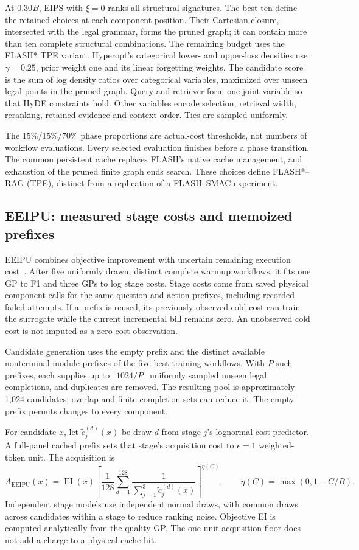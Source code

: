 At $0.30B$, EIPS with $\xi=0$ ranks all structural signatures. The best ten
define the retained choices at each component position. Their Cartesian
closure, intersected with the legal grammar, forms the pruned graph; it
can contain more than ten complete structural combinations. The remaining
budget uses the FLASH* TPE variant. Hyperopt's categorical lower- and
upper-loss densities use $\gamma=0.25$, prior weight one and its linear
forgetting weights. The candidate score is the sum of log density ratios
over categorical variables, maximized over unseen legal points in the
pruned graph. Query and retriever form one joint variable so that HyDE
constraints hold. Other variables encode selection, retrieval width,
reranking, retained evidence and context order. Ties are sampled uniformly.

The 15\%/15\%/70\% phase proportions are actual-cost thresholds, not
numbers of workflow evaluations. Every selected evaluation finishes before
a phase transition. The common persistent cache replaces FLASH's native
cache management, and exhaustion of the pruned finite graph ends search.
These choices define FLASH*--RAG (TPE), distinct from a replication of a
FLASH--SMAC experiment.

\subsection{EEIPU: measured stage costs and memoized prefixes}
\label{sec:eeipu-rag-adapter}
EEIPU combines objective improvement with uncertain remaining execution
cost~\citep{essofi2024memoization}. After five uniformly drawn, distinct
complete warmup workflows, it fits one GP to F1 and three GPs to log
stage costs. Stage costs come from saved physical component calls for the
same question and action prefixes, including recorded failed attempts.
If a prefix is reused, its previously observed cold cost can train the
surrogate while the current incremental bill remains zero. An unobserved
cold cost is not imputed as a zero-cost observation.

Candidate generation uses the empty prefix and the distinct available
nonterminal module prefixes of the five best training workflows. With
$P$ such prefixes, each supplies up to $\lceil1024/P\rceil$ uniformly
sampled unseen legal completions, and duplicates are removed. The resulting
pool is approximately 1,024 candidates; overlap and finite completion
sets can reduce it. The empty prefix permits changes to every component.

For candidate $x$, let $\widetilde c_j^{(d)}(x)$ be draw $d$ from stage
$j$'s lognormal cost predictor. A full-panel cached prefix sets that stage's
acquisition cost to $\epsilon=1$ weighted-token unit. The acquisition is
\[
 A_{\mathrm{EEIPU}}(x)=\operatorname{EI}(x)
 \left[\frac{1}{128}\sum_{d=1}^{128}
       \frac{1}{\sum_{j=1}^{3}\widetilde c_j^{(d)}(x)}\right]^{\eta(C)},
 \qquad \eta(C)=\max(0,1-C/B).
\]
Independent stage models use independent normal draws, with common draws
across candidates within a stage to reduce ranking noise. Objective EI is
computed analytically from the quality GP. The one-unit acquisition floor
does not add a charge to a physical cache hit.


